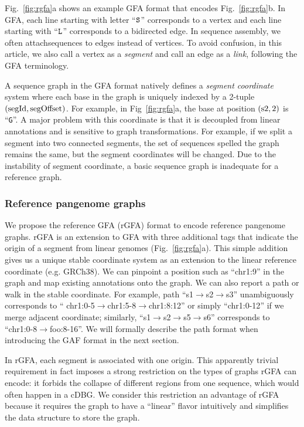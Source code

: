 \documentclass[twocolumn]{bmcart}%
\begin{document}
{\flushleft
Fig.~\ref{fig:rgfa}a shows an example GFA format that encodes
Fig.~\ref{fig:rgfa}b. In GFA, each line starting with letter ``${\tt S}$''
corresponds to a vertex and each line starting with ``${\tt L}$'' corresponds
to a bidirected edge. In sequence assembly, we often attachsequences to edges
instead of vertices. To avoid confusion, in this article, we also call a vertex
as a \emph{segment} and call an edge as a \emph{link}, following the GFA
terminology.
}

A sequence graph in the GFA format natively defines a \emph{segment coordinate}
system where each base in the graph is uniquely indexed by a
2-tuple $({\rm segId},{\rm segOffset})$. For example, in
Fig~\ref{fig:rgfa}a, the base at position $({\rm s2},2)$ is ``{\tt G}''.
A major problem with this coordinate is that it is decoupled from linear
annotations and is sensitive to graph transformations. For example, if we split
a segment into two connected segments, the set of sequences spelled the graph
remains the same, but the segment coordinates will be changed. Due to the
instability of segment coordinate, a basic sequence graph is inadequate for a
reference graph.

\subsubsection*{Reference pangenome graphs}

We propose the reference GFA (rGFA) format to encode reference pangenome graphs.
rGFA is an extension to GFA with three additional tags that indicate the origin
of a segment from linear genomes (Fig.~\ref{fig:rgfa}a). This simple addition
gives us a unique stable coordinate system as an extension to the linear
reference coordinate (e.g. GRCh38). We can pinpoint a position such as
``{\sf chr1:9}'' in the graph and map existing annotations onto the graph. We can
also report a path or walk in the stable coordinate. For example, path
``{\sf s1$\to$s2$\to$s3}'' unambiguously corresponds to ``{\sf
chr1:0-5$\to$chr1:5-8$\to$chr1:8:12}'' or simply ``{\sf chr1:0-12}'' if we
merge adjacent coordinate; similarly, ``{\sf s1$\to$s2$\to$s5$\to$s6}''
corresponds to ``{\sf chr1:0-8$\to$foo:8-16}''. We will formally describe the
path format when introducing the GAF format in the next section.

In rGFA, each segment is associated with one origin. This apparently trivial
requirement in fact imposes a strong restriction on the types of graphs rGFA
can encode: it forbids the collapse of different regions from one sequence,
which would often happen in a cDBG. We consider this restriction an
advantage of rGFA because it requires the graph to have a ``linear'' flavor
intuitively and simplifies the data structure to store the graph.
\end{document}
